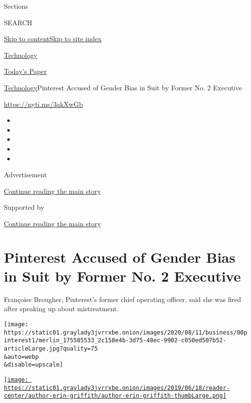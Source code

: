 Sections

SEARCH

\protect\hyperlink{site-content}{Skip to
content}\protect\hyperlink{site-index}{Skip to site index}

\href{https://www.nytimes3xbfgragh.onion/section/technology}{Technology}

\href{https://myaccount.nytimes3xbfgragh.onion/auth/login?response_type=cookie\&client_id=vi}{}

\href{https://www.nytimes3xbfgragh.onion/section/todayspaper}{Today's
Paper}

\href{/section/technology}{Technology}\textbar{}Pinterest Accused of
Gender Bias in Suit by Former No. 2 Executive

\url{https://nyti.ms/3akXwGb}

\begin{itemize}
\item
\item
\item
\item
\item
\end{itemize}

Advertisement

\protect\hyperlink{after-top}{Continue reading the main story}

Supported by

\protect\hyperlink{after-sponsor}{Continue reading the main story}

\hypertarget{pinterest-accused-of-gender-bias-in-suit-by-former-no-2-executive}{%
\section{Pinterest Accused of Gender Bias in Suit by Former No. 2
Executive}\label{pinterest-accused-of-gender-bias-in-suit-by-former-no-2-executive}}

Françoise Brougher, Pinterest's former chief operating officer, said she
was fired after speaking up about mistreatment.

\texttt{[image: https://static01.graylady3jvrrxbe.onion/images/2020/08/11/business/00pinterest1/merlin\_175585533\_2c158e4b-3d75-48ec-9902-c050ed507b52-articleLarge.jpg?quality=75\\\&auto=webp\\\&disable=upscale]}

\href{https://www.nytimes3xbfgragh.onion/by/erin-griffith}{\texttt{[image: https://static01.graylady3jvrrxbe.onion/images/2019/06/18/reader-center/author-erin-griffith/author-erin-griffith-thumbLarge.png]}}

